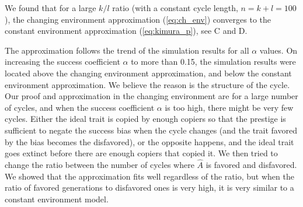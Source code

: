 \documentclass[12pt]{extarticle}
\begin{document}
We found that for a large $k/l$ ratio (with a constant cycle length, $n=k+l=100$), the changing environment approximation (\cref{eq:ch_env}) converges to the constant environment approximation (\cref{eq:kimura_p}), see C and D.

The approximation follows the trend of the simulation results for all $\alpha$ values.
{On} increasing the success coefficient {$\alpha$} to more than 0.15, the simulation results were located above the changing environment approximation, and below the constant environment approximation. We believe the reason is the structure of the cycle.
Our proof and approximation in the changing environment are for a large {number} of cycles, and when the success coefficient {$\alpha$} is too high, there might be very few cycles. Either the ideal trait is copied by enough copiers so that the prestige is sufficient to negate the success bias when the cycle changes (and the trait favored by the bias becomes the disfavored), or the opposite happens, and the ideal trait {goes} extinct before there {are} enough copiers that copied it.
We then tried to change the ratio between the number of cycles where $\hat{A}$ is favored and disfavored. We showed that the approximation fits well regardless of the ratio, but when the ratio of favored generations to disfavored ones is very high, it is very similar to a constant environment model.
\end{document}
